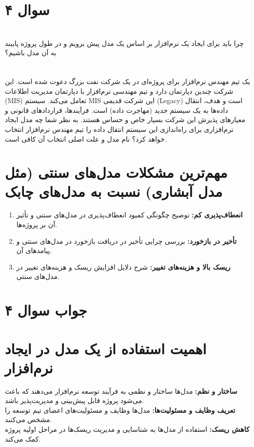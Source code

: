 \section*{سوال ۴}

\section*{}
 چرا باید برای ایجاد یک نرم‌افزار بر اساس یک مدل پیش برویم و در طول پروژه پایبند به آن مدل باشیم؟

\section*{}
یک تیم مهندس نرم‌افزار برای پروژه‌ای در یک شرکت نفت بزرگ دعوت شده است. این شرکت چندین دپارتمان دارد و تیم مهندسی نرم‌افزار با دپارتمان مدیریت اطلاعات (MIS) تعامل می‌کند. سیستم MIS این شرکت قدیمی (Legacy) است و هدف، انتقال داده‌ها به یک سیستم جدید (مهاجرت داده) است. فرآیندها، قراردادهای قانونی و معیارهای پذیرش این شرکت بسیار خاص و حساس هستند. به نظر شما چه مدل ایجاد نرم‌افزاری برای راه‌اندازی این سیستم انتقال داده را تیم مهندس نرم‌افزار انتخاب خواهد کرد؟ نام مدل و علت اصلی انتخاب آن کافی است.

\section*{ مهم‌ترین مشکلات مدل‌های سنتی (مثل مدل آبشاری) نسبت به مدل‌های چابک}
\begin{enumerate}
	\item \textbf{انعطاف‌پذیری کم:} توضیح چگونگی کمبود انعطاف‌پذیری در مدل‌های سنتی و تأثیر آن بر پروژه‌ها.
	\item \textbf{تأخیر در بازخورد:} بررسی چرایی تأخیر در دریافت بازخورد در مدل‌های سنتی و پیامدهای آن.
	\item \textbf{ریسک بالا و هزینه‌های تغییر:} شرح دلایل افزایش ریسک و هزینه‌های تغییر در مدل‌های سنتی.
\end{enumerate}

\section*{جواب سوال ۴}

\section*{ اهمیت استفاده از یک مدل در ایجاد نرم‌افزار}
\textbf{ساختار و نظم:} مدل‌ها ساختار و نظمی به فرآیند توسعه نرم‌افزار می‌دهند که باعث می‌شود پروژه قابل پیش‌بینی و مدیریت‌پذیر باشد. \\
\textbf{تعریف وظایف و مسئولیت‌ها:} مدل‌ها وظایف و مسئولیت‌های اعضای تیم توسعه را مشخص می‌کنند. \\
\textbf{کاهش ریسک:} استفاده از مدل‌ها به شناسایی و مدیریت ریسک‌ها در مراحل اولیه پروژه کمک می‌کند.

